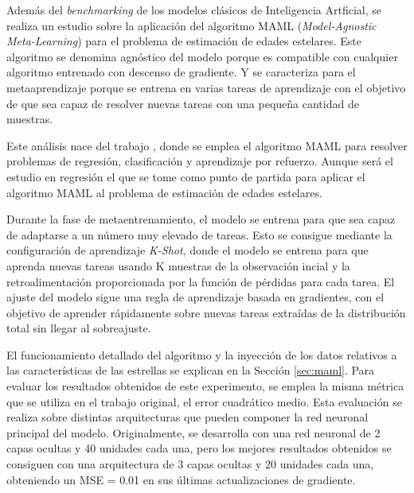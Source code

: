 \vspace{0.25cm}

Además del \emph{benchmarking} de los modelos clásicos de Inteligencia Artficial, se realiza un estudio sobre la aplicación del algoritmo MAML (\emph{Model-Agnostic Meta-Learning}) para el problema de estimación de edades estelares. Este algoritmo se denomina agnóstico del modelo porque es compatible con cualquier algoritmo entrenado con descenso de gradiente. Y se caracteriza para el metaaprendizaje porque se entrena en varias tareas de aprendizaje con el objetivo de que sea capaz de resolver nuevas tareas con una pequeña cantidad de muestras.

\vspace{0.25cm} 

Este análisis nace del trabajo \cite{finn2017modelagnostic}, donde se emplea el algoritmo MAML para resolver problemas de regresión, clasificación y aprendizaje por refuerzo. Aunque será el estudio en regresión el que se tome como punto de partida para aplicar el algoritmo MAML al problema de estimación de edades estelares.

\vspace{0.25cm} 

Durante la fase de metaentrenamiento, el modelo se entrena para que sea capaz de adaptarse a un número muy elevado de tareas. Esto se consigue mediante la configuración de aprendizaje \emph{K-Shot}, donde el modelo se entrena para que aprenda nuevas tareas usando K muestras de la observación incial y la retroalimentación proporcionada por la función de pérdidas para cada tarea. El ajuste del modelo sigue una regla de aprendizaje basada en gradientes, con el objetivo de aprender rápidamente sobre nuevas tareas extraídas de la distribución total sin llegar al sobreajuste. 

\vspace{0.25cm}

El funcionamiento detallado del algoritmo y la inyección de los datos relativos a las características de las estrellas se explican en la Sección \ref{sec:maml}. Para evaluar los resultados obtenidos de este experimento, se emplea la misma métrica que se utiliza en el trabajo original, el error cuadrático medio. Esta evaluación se realiza sobre distintas arquitecturas que pueden componer la red neuronal principal del modelo. Originalmente, se desarrolla con una red neuronal de 2 capas ocultas y 40 unidades cada una, pero los mejores resultados obtenidos se consiguen con una arquitectura de 3 capas ocultas y 20 unidades cada una, obteniendo un MSE = 0.01 en sus últimas actualizaciones de gradiente.


